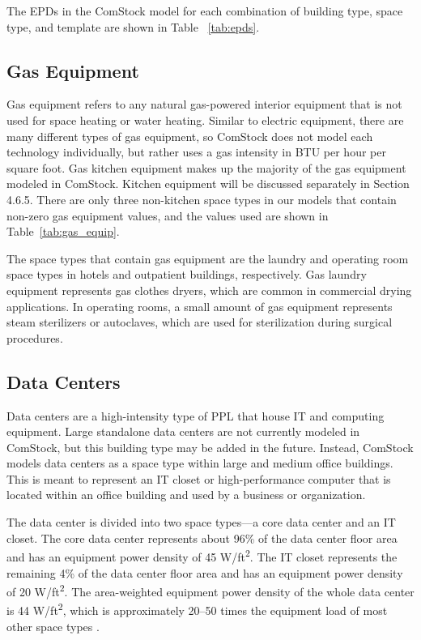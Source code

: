 The EPDs in the ComStock model for each combination of building type, space type, and template are shown in Table ~\ref{tab:epds}.

%

\subsection{Gas Equipment}

Gas equipment refers to any natural gas-powered interior equipment that is not used for space heating or water heating. Similar to electric equipment, there are many different types of gas equipment, so ComStock does not model each technology individually, but rather uses a gas intensity in BTU per hour per square foot. Gas kitchen equipment makes up the majority of the gas equipment modeled in ComStock. Kitchen equipment will be discussed separately in Section 4.6.5. There are only three non-kitchen space types in our models that contain non-zero gas equipment values, and the values used are shown in Table~\ref{tab:gas_equip}. 



The space types that contain gas equipment are the laundry and operating room space types in hotels and outpatient buildings, respectively. Gas laundry equipment represents gas clothes dryers, which are common in commercial drying applications. In operating rooms, a small amount of gas equipment represents steam sterilizers or autoclaves, which are used for sterilization during surgical procedures.

\subsection{Data Centers}

Data centers are a high-intensity type of PPL that house IT and computing equipment. Large standalone data centers are not currently modeled in ComStock, but this building type may be added in the future. Instead, ComStock models data centers as a space type within large and medium office buildings. This is meant to represent an IT closet or high-performance computer that is located within an office building and used by a business or organization. 

The data center is divided into two space types---a core data center and an IT closet. The core data center represents about 96\% of the data center floor area and has an equipment power density of 45 W/ft\textsuperscript{2}. The IT closet represents the remaining 4\% of the data center floor area and has an equipment power density of 20 W/ft\textsuperscript{2}. The area-weighted equipment power density of the whole data center is 44 W/ft\textsuperscript{2}, which is approximately 20--50 times the equipment load of most other space types \citep{osti_1129366}.

